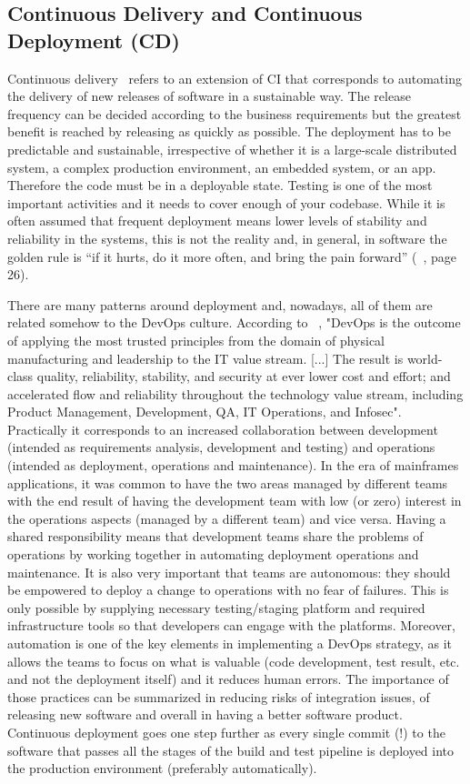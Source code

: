 \documentclass[a4paper]{spie}  %
\begin{document}
\subsection{Continuous Delivery and Continuous Deployment (CD)}
Continuous delivery~\cite{CD} refers to an extension of CI that corresponds to automating the delivery of new releases of software in a sustainable way. The release frequency can be decided according to the business requirements but the greatest benefit is reached by releasing as quickly as possible.
The deployment has to be predictable and sustainable, irrespective of whether it is a large-scale distributed system, a complex production environment, an embedded system, or an app. Therefore the code must be in a deployable state. Testing is one of the most important activities and it needs to cover enough of your codebase.
While it is often assumed that frequent deployment means lower levels of stability and reliability in the systems, this is not the reality and, in general, in software the golden rule is “if it hurts, do it more often, and bring the pain forward” (~\cite{CD}, page 26).

There are many patterns around deployment and, nowadays, all of them are related somehow to the DevOps culture. According to ~\cite{DevOps}, "DevOps is the outcome of applying the most trusted principles from the domain of physical manufacturing and leadership to the IT value stream. [...] The result is world-class quality, reliability, stability, and security at ever lower cost and effort; and accelerated flow and reliability throughout the technology value stream, including Product Management, Development, QA, IT Operations, and Infosec". Practically it corresponds to an increased collaboration between development (intended as requirements analysis, development and testing) and operations (intended as deployment, operations and maintenance). In the era of mainframes applications, it was common to have the two areas managed by different teams with the end result of having the development team with low (or zero) interest in the operations aspects (managed by a different team) and vice versa. Having a shared responsibility means that development teams share the problems of operations by working together in automating deployment operations and maintenance. It is also very important that teams are autonomous: they should be empowered to deploy a change to operations with no fear of failures. This is only possible by supplying necessary testing/staging platform and required infrastructure tools so that developers  can engage with the platforms.
Moreover, automation is one of the key elements in implementing a DevOps strategy, as it allows the teams to focus on what is valuable (code development, test result, etc. and not the deployment itself) and it reduces human errors.
The importance of those practices can be summarized in reducing risks of integration issues, of releasing new software and overall in having a better software product.
Continuous deployment goes one step further as every single commit (!) to the software that passes all the stages of the build and test pipeline is deployed into the production environment (preferably automatically).
\end{document}

